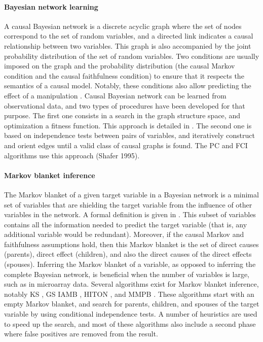 \paragraph{Bayesian network learning} A causal Bayesian network is a discrete
acyclic graph where the set of nodes correspond to the set of random variables,
and a directed link indicates a causal relationship between two variables. This
graph is also accompanied by the joint probability distribution of the set of
random variables. Two conditions are usually imposed on the graph and the
probability distribution (the causal Markov condition and the causal
faithfulness condition) to ensure that it respects the semantics of a causal
model. Notably, these conditions also allow predicting the effect of a
manipulation \parencite{spirtes2010introduction}. Causal Bayesian network can be
learned from observational data, and two types of procedures have been developed
for that purpose. The first one consists in a search in the graph structure
space, and optimization a fitness function. This approach is detailed in
\parencite{heckerman1998tutorial}. The second one is based on independence tests
between pairs of variables, and iteratively construct and orient edges until a
valid class of causal graphs is found. The PC and FCI algorithms use this
approach (Shafer 1995).

\paragraph{Markov blanket inference} The Markov blanket of a given target
variable in a Bayesian network is a minimal set of variables that are shielding
the target variable from the influence of other variables in the network. A
formal definition is given in \parencite{guyon2007causal}. This subset of
variables contains all the information needed to predict the target variable
(that is, any additional variable would be redundant). Moreover, if the causal
Markov and faithfulness assumptions hold, then this Markov blanket is the set of
direct causes (parents), direct effect (children), and also the direct causes of
the direct effects (spouses). Inferring the Markov blanket of a variable, as
opposed to inferring the complete Bayesian network, is beneficial when the
number of variables is large, such as in microarray data. Several algorithms
exist for Markov blanket inference, notably KS \parencite{koller1996towards},
GS \parencite{margaritis2000bayesian} IAMB \parencite{tsamardinos2003time},
HITON \parencite{aliferis2003hiton}, and MMPB \parencite{tsamardinos2003time}.
These algorithms start with an empty Markov blanket, and search for parents,
children, and spouses of the target variable by using conditional independence
tests. A number of heuristics are used to speed up the search, and most of these
algorithms also include a second phase where false positives are removed from
the result.

